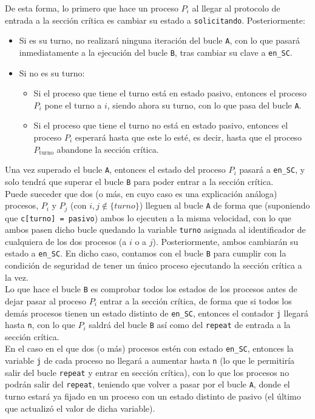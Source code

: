 De esta forma, lo primero que hace un proceso $P_i$ al llegar al protocolo de entrada a la sección crítica es cambiar su estado a \verb|solicitando|. Posteriormente:
\begin{itemize}
    \item Si es su turno, no realizará ninguna iteración del bucle \verb|A|, con lo que pasará inmediatamente a la ejecución del bucle \verb|B|, tras cambiar su clave a \verb|en_SC|.
    \item Si no es su turno:
        \begin{itemize}
            \item Si el proceso que tiene el turno está en estado pasivo, entonces el proceso $P_i$ pone el turno a $i$, siendo ahora su turno, con lo que pasa del bucle \verb|A|.
            \item Si el proceso que tiene el turno no está en estado pasivo, entonces el proceso $P_i$ esperará hasta que este lo esté, es decir, hasta que el proceso $P_{\text{turno}}$ abandone la sección crítica.
        \end{itemize}
\end{itemize}
Una vez superado el bucle \verb|A|, entonces el estado del proceso $P_i$ pasará a \verb|en_SC|, y solo tendrá que superar el bucle \verb|B| para poder entrar a la sección crítica.\\

Puede sueceder que dos (o más, en cuyo caso es una explicación análoga) procesos, $P_i$ y $P_j$ (con $i,j\notin \{turno\}$) lleguen al bucle \verb|A| de forma que (suponiendo que \verb|c[turno] = pasivo|) ambos lo ejecuten a la misma velocidad, con lo que ambos pasen dicho bucle quedando la variable \verb|turno| asignada al identificador de cualquiera de los dos procesos (a $i$ o a $j$). Posteriormente, ambos cambiarán su estado a \verb|en_SC|. En dicho caso, contamos con el bucle \verb|B| para cumplir con la condición de seguridad de tener un único proceso ejecutando la sección crítica a la vez.\\

Lo que hace el bucle \verb|B| es comprobar todos los estados de los procesos antes de dejar pasar al proceso $P_i$ entrar a la sección crítica, de forma que si todos los demás procesos tienen un estado distinto de \verb|en_SC|, entonces el contador \verb|j| llegará hasta \verb|n|, con lo que $P_i$ saldrá del bucle \verb|B| así como del \verb|repeat| de entrada a la sección crítica.\\

En el caso en el que dos (o más) procesos estén con estado \verb|en_SC|, entonces la variable \verb|j| de cada proceso no llegará a aumentar hasta \verb|n| (lo que le permitiría salir del bucle \verb|repeat| y entrar en sección crítica), con lo que los procesos no podrán salir del \verb|repeat|, teniendo que volver a pasar por el bucle \verb|A|, donde el turno estará ya fijado en un proceso con un estado distinto de pasivo (el último que actualizó el valor de dicha variable).

